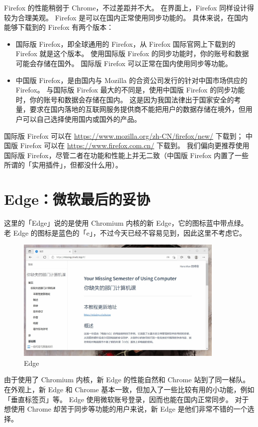 Firefox 的性能稍弱于 Chrome，不过差距并不大。
在界面上，Firefox 同样设计得较为合理美观。
Firefox 是可以在国内正常使用同步功能的。
具体来说，在国内能够下载到的 Firefox 有两个版本：

\begin{itemize}
  \item 国际版 Firefox，即全球通用的 Firefox，从 Firefox 国际官网上下载到的 Firefox 就是这个版本。
    使用国际版 Firefox 的同步功能时，你的账号和数据可能会存储在国外。
    国际版 Firefox 可以正常在国内使用同步等功能。
  \item 中国版 Firefox，是由国内与 Mozilla 的合资公司发行的针对中国市场供应的 Firefox。
    与国际版 Firefox 最大的不同是，使用中国版 Firefox 的同步功能时，你的账号和数据会存储在国内。
    这是因为我国法律出于国家安全的考量，要求在国内落地的互联网服务提供商不能把用户的数据存储在境外，但用户可以自己选择使用国内或国外的产品。
\end{itemize}

国际版 Firefox 可以在 \url{https://www.mozilla.org/zh-CN/firefox/new/} 下载到；
中国版 Firefox 可以在 \url{https://www.firefox.com.cn/} 下载到。
我们偏向更推荐使用国际版 Firefox，尽管二者在功能和性能上并无二致（中国版 Firefox 内置了一些所谓的「实用插件」，但都没什么用）。

\section{Edge：微软最后的妥协}

这里的「Edge」说的是使用 Chromium 内核的新 Edge，它的图标蓝中带点绿。
老 Edge 的图标是蓝色的「e」，不过今天已经不容易见到，因此这里不考虑它。

\begin{figure}[htb!]
  \centering
  \includegraphics[width=10cm]{assets/Edge.jpg}
  \caption{Edge}
  \label{Edge}
\end{figure}

由于使用了 Chromium 内核，新 Edge 的性能自然和 Chrome 站到了同一梯队。
在外观上，新 Edge 和 Chrome 基本一致，但加入了一些比较有用的小功能，例如「垂直标签页」等。
Edge 使用微软账号登录，因而也能在国内正常同步。
对于想使用 Chrome 却苦于同步等功能的用户来说，新 Edge 是他们非常不错的一个选择。

